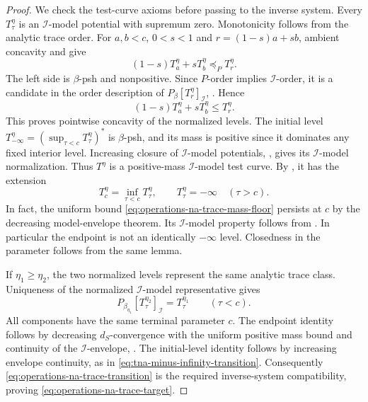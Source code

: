 \begin{proof}
We check the test-curve axioms before passing to the inverse system.
Every $T_\tau^\eta$ is an $\mathcal I$-model potential with supremum
zero.  Monotonicity follows from the analytic trace order.
For $a,b<c$, $0<s<1$ and $r=(1-s)a+sb$, ambient concavity and
 give
\[
 (1-s)T_a^\eta+sT_b^\eta\preceq_P T_r^\eta.
\]
The left side is $\beta$-psh and nonpositive.  Since $P$-order implies
$\mathcal I$-order, it is a candidate in the order description of
$P_\beta[T_r^\eta]_{\mathcal I}$,
\cite[Corollary~6.1.3]{XiaBook}.  Hence
\[
             (1-s)T_a^\eta+sT_b^\eta\leq T_r^\eta.
\tag{54.32b}\label{eq:operations-na-trace-concavity}
\]
This proves pointwise concavity of the normalized levels.
The initial level
$T_{-\infty}^\eta=(\sup_{\tau<c}T_\tau^\eta)^*$
is $\beta$-psh, and its mass is positive since it dominates any
fixed interior level.  Increasing closure of $\mathcal I$-model
potentials, \cite[Proposition~3.2.13]{XiaBook}, gives its
$\mathcal I$-model normalization.
Thus $T^\eta$ is a positive-mass $\mathcal I$-model test curve.
By , it has the extension
\[
 T_c^\eta=\inf_{\tau<c}T_\tau^\eta,\qquad
 T_\tau^\eta=-\infty\quad(\tau>c).
\tag{54.32c}\label{eq:operations-na-trace-closed-endpoint}
\]
In fact, the uniform bound
\eqref{eq:operations-na-trace-mass-floor} persists at $c$ by the
decreasing model-envelope theorem.  Its $\mathcal I$-model property
follows from \cite[Proposition~3.2.12]{XiaBook}.
In particular the endpoint is not an identically $-\infty$ level.
Closedness in the parameter follows from the same lemma.

If $\eta_1\geq\eta_2$, the two normalized levels represent the same
analytic trace class.  Uniqueness of the normalized
$\mathcal I$-model representative gives
\[
       P_{\beta_{\eta_1}}[T_\tau^{\eta_2}]_{\mathcal I}
       =T_\tau^{\eta_1}\qquad(\tau<c).
\tag{54.32d}\label{eq:operations-na-trace-transition}
\]
All components have the same terminal parameter $c$.
The endpoint identity follows by decreasing $d_S$-convergence with
the uniform positive mass bound and continuity of the
$\mathcal I$-envelope, \cite[Theorem~6.2.3]{XiaBook}.
The initial-level identity follows by increasing envelope
continuity, as in \eqref{eq:tna-minus-infinity-transition}.
Consequently \eqref{eq:operations-na-trace-transition} is the
required inverse-system compatibility, proving
\eqref{eq:operations-na-trace-target}.


\end{proof}
